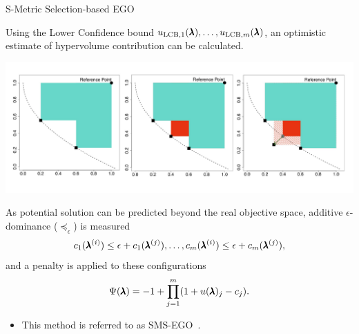 \begin{frame}[allowframebreaks]{S-Metric Selection-based EGO}

    Using the Lower Confidence bound $u_{\text{LCB}, 1}(\pmb{\lambda}), \dots, u_{\text{LCB}, m}(\pmb{\lambda})$, an optimistic estimate of hypervolume contribution can be calculated.

    \begin{center}
        \includegraphics[scale=0.35]{images/hv_contribution_2}
    \end{center}

    \framebreak

    As potential solution can be predicted beyond the real objective space, additive $\epsilon$-dominance ($\preceq_\epsilon$) is measured
            $$
                c_1(\pmb{\lambda}^{(i)}) \le \epsilon+c_1(\pmb{\lambda}^{(j)}), \dots, c_m(\pmb{\lambda}^{(i)}) \le \epsilon+c_m(\pmb{\lambda}^{(j)}),
            $$
            and a penalty is applied to these configurations
            $$
                \Psi(\pmb{\lambda}) = -1 + \prod_{j=1}^m(1+u(\pmb{\lambda})_j - c_j).
            $$

    \begin{itemize}
        \item This method is referred to as SMS-EGO~.
    \end{itemize}
\end{frame}

